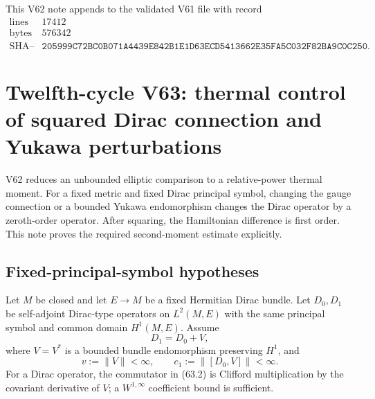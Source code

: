 \documentclass[11pt]{article}
\theoremstyle{remark}
\begin{document}
This V62 note appends to the validated V61 file with record
\[
\begin{array}{c|c}
\text{lines}&17412\\
\text{bytes}&576342\\
\text{SHA--256}&
\texttt{205999C72BC0B071A4439E842B1E1D63ECD5413662E35FA5C032F82BA9C0C250}.
\end{array}
\]


\section{Twelfth-cycle V63: thermal control of squared Dirac
connection and Yukawa perturbations}
\label{sec:v12v63}

V62 reduces an unbounded elliptic comparison to a relative-power
thermal moment.  For a fixed metric and fixed Dirac principal
symbol, changing the gauge connection or a bounded Yukawa
endomorphism changes the Dirac operator by a zeroth-order operator.
After squaring, the Hamiltonian difference is first order.  This
note proves the required second-moment estimate explicitly.

\subsection{Fixed-principal-symbol hypotheses}

Let \(M\) be closed and let \(E\to M\) be a fixed Hermitian Dirac
bundle.  Let \(D_0,D_1\) be self-adjoint Dirac-type operators on
\(L^2(M,E)\) with the same principal symbol and common domain
\(H^1(M,E)\).  Assume
\begin{equation}
                         D_1=D_0+V,               \tag{63.1}
\end{equation}
where \(V=V^*\) is a bounded bundle endomorphism preserving
\(H^1\), and
\begin{equation}
 v:=\|V\|<\infty,\qquad
 c_1:=\|[D_0,V]\|<\infty.                         \tag{63.2}
\end{equation}
For a Dirac operator, the commutator in (63.2) is Clifford
multiplication by the covariant derivative of \(V\); a
\(W^{1,\infty}\) coefficient bound is sufficient.
\end{document}
